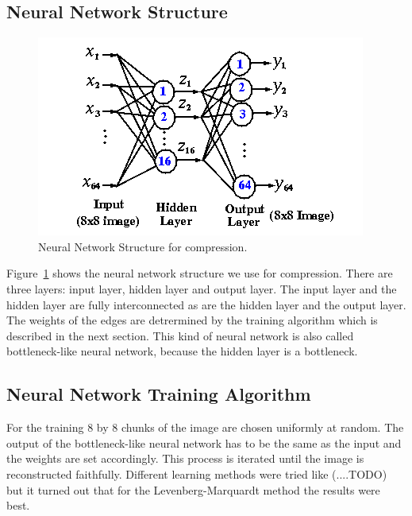 \documentclass[10pt,conference,compsocconf]{IEEEtran}
\begin{document}
\subsection{Neural Network Structure}
\label{sec:neural_net_structure}
\begin{figure}[tbp]
  \centering
  \includegraphics[width=\columnwidth]{nnStructure}
  \caption{Neural Network Structure for compression.}
  \label{fig:nnStructure}
\end{figure}

Figure~\ref{fig:nnStructure} shows the neural network structure we use for compression. There are three layers: input layer, hidden layer and output layer. The input layer and the hidden layer are fully interconnected as are the hidden layer and the output layer. The weights of the edges are detrermined by the training algorithm which is described in the next section. This kind of neural network is also called bottleneck-like neural network, because the hidden layer is a bottleneck.

\subsection{Neural Network Training Algorithm}
For the training 8 by 8 chunks of the image are chosen uniformly at random. The output of the bottleneck-like neural network has to be the same as the input and the weights are set accordingly. This process is iterated until the image is reconstructed faithfully.  
Different learning methods were tried like (....TODO) but it turned out that for the Levenberg-Marquardt method the results were best. 
\end{document}
